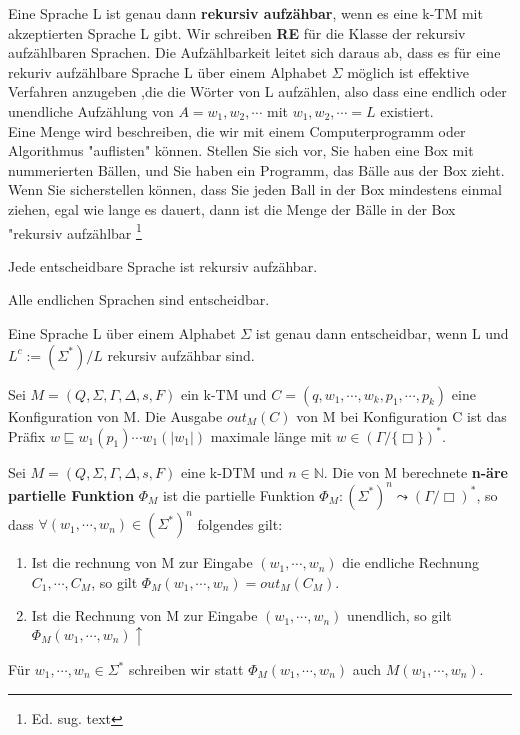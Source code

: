   Eine Sprache L ist genau dann \textbf{rekursiv aufzähbar}, wenn es eine k-TM mit akzeptierten Sprache L gibt. Wir schreiben \textbf{RE} für die Klasse der rekursiv aufzählbaren Sprachen. Die Aufzählbarkeit leitet sich daraus ab, dass es für eine rekuriv aufzählbare Sprache L über einem Alphabet \(\Sigma\) möglich ist effektive Verfahren anzugeben ,die die Wörter von L aufzählen, also dass eine endlich oder unendliche Aufzählung von \(A = w_1, w_2, \cdots \) mit \( {w_1, w_2, \cdots} = L\) existiert.\vspace{0.5cm}
  \\
  Eine Menge wird beschreiben, die wir mit einem Computerprogramm oder Algorithmus "auflisten" können. Stellen Sie sich vor, Sie haben eine Box mit nummerierten Bällen, und Sie haben ein Programm, das Bälle aus der Box zieht. Wenn Sie sicherstellen können, dass Sie jeden Ball in der Box mindestens einmal ziehen, egal wie lange es dauert, dann ist die Menge der Bälle in der Box "rekursiv aufzählbar
  \footnote{Ed. sug. text}

  Jede entscheidbare Sprache ist rekursiv aufzähbar.

  Alle endlichen Sprachen sind entscheidbar.

  Eine Sprache L über einem Alphabet \(\Sigma\) ist genau dann entscheidbar, wenn L und \(L^c :=(\Sigma^*)/L\) rekursiv aufzähbar sind.

  Sei \(M = (Q, \Sigma, \Gamma, \Delta, s, F)\) ein k-TM und \(C = (q, w_1, \cdots, w_k, p_1, \cdots, p_k)\) eine Konfiguration von M. Die Ausgabe \(out_M(C)\) von M bei Konfiguration C ist das Präfix \(w \sqsubseteq w_1(p_1) \cdots w_1(|w_1|)\) maximale länge mit \(w \in (\Gamma / \{\Box\})^*\).


  Sei \(M = (Q, \Sigma, \Gamma, \Delta, s, F)\) eine k-DTM und \(n \in \mathbb{N}\). Die von M berechnete \textbf{n-äre partielle Funktion} \(\Phi_M\) ist die partielle Funktion \(\Phi_M : (\Sigma^*)^n \leadsto (\Gamma / {\Box})^*\), so dass \(\forall (w_1, \cdots, w_n) \in (\Sigma^*)^n\) folgendes gilt:
  \begin{enumerate}
    \item Ist die rechnung von M zur Eingabe \((w_1, \cdots, w_n)\) die endliche Rechnung \(C_1, \cdots, C_M\), so gilt \(\Phi_M(w_1, \cdots, w_n) = out_M(C_M)\).
    \item Ist die Rechnung von M zur Eingabe \((w_1, \cdots, w_n)\) unendlich, so gilt \(\Phi_M(w_1, \cdots, w_n)\uparrow\) 
  \end{enumerate}
  Für \(w_1, \cdots, w_n \in \Sigma^*\) schreiben wir statt \(\Phi_M(w_1, \cdots, w_n)\) auch \(M(w_1, \cdots, w_n)\).

